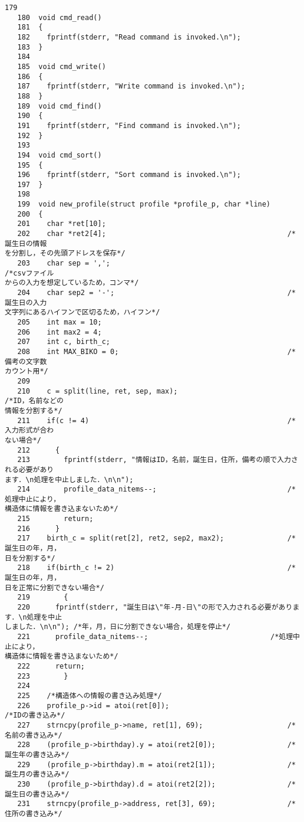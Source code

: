 \begin{Verbatim}[fontsize=\small, baselinestretch=0.8]
   179	
   180	void cmd_read()
   181	{
   182	  fprintf(stderr, "Read command is invoked.\n");
   183	}
   184	
   185	void cmd_write()
   186	{
   187	  fprintf(stderr, "Write command is invoked.\n");
   188	}
   189	void cmd_find()
   190	{
   191	  fprintf(stderr, "Find command is invoked.\n");
   192	}
   193	
   194	void cmd_sort()
   195	{
   196	  fprintf(stderr, "Sort command is invoked.\n");
   197	}
   198	
   199	void new_profile(struct profile *profile_p, char *line)
   200	{
   201	  char *ret[10];
   202	  char *ret2[4];                                           /*誕生日の情報
を分割し，その先頭アドレスを保存*/
   203	  char sep = ',';                                          /*csvファイル
からの入力を想定しているため，コンマ*/
   204	  char sep2 = '-';                                         /*誕生日の入力
文字列にあるハイフンで区切るため，ハイフン*/
   205	  int max = 10;
   206	  int max2 = 4;
   207	  int c, birth_c;
   208	  int MAX_BIKO = 0;                                        /*備考の文字数
カウント用*/
   209	  
   210	  c = split(line, ret, sep, max);                          /*ID，名前などの
情報を分割する*/
   211	  if(c != 4)                                               /*入力形式が合わ
ない場合*/
   212	    {
   213	      fprintf(stderr, "情報はID，名前，誕生日，住所，備考の順で入力される必要があり
ます．\n処理を中止しました．\n\n");
   214	      profile_data_nitems--;                               /*処理中止により，
構造体に情報を書き込まないため*/
   215	      return;
   216	    }
   217	  birth_c = split(ret[2], ret2, sep2, max2);               /*誕生日の年，月，
日を分割する*/
   218	  if(birth_c != 2)                                         /*誕生日の年，月，
日を正常に分割できない場合*/
   219	      {
   220		fprintf(stderr, "誕生日は\"年-月-日\"の形で入力される必要があります．\n処理を中止
しました．\n\n"); /*年，月，日に分割できない場合，処理を停止*/
   221		profile_data_nitems--;                             /*処理中止により，
構造体に情報を書き込まないため*/
   222		return;
   223	      }
   224	
   225	  /*構造体への情報の書き込み処理*/
   226	  profile_p->id = atoi(ret[0]);                            /*IDの書き込み*/
   227	  strncpy(profile_p->name, ret[1], 69);                    /*名前の書き込み*/
   228	  (profile_p->birthday).y = atoi(ret2[0]);                 /*誕生年の書き込み*/
   229	  (profile_p->birthday).m = atoi(ret2[1]);                 /*誕生月の書き込み*/
   230	  (profile_p->birthday).d = atoi(ret2[2]);                 /*誕生日の書き込み*/
   231	  strncpy(profile_p->address, ret[3], 69);                 /*住所の書き込み*/

\end{Verbatim}
